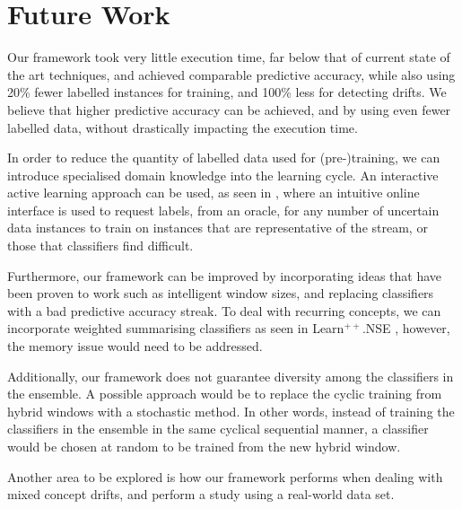 
\section{Future Work}
Our framework took very little execution time, far below that of current state of the art techniques, and achieved comparable predictive accuracy, while also using 20\% fewer labelled instances for training, and 100\% less for detecting drifts. We believe that higher predictive accuracy can be achieved, and by using even fewer labelled data, without drastically impacting the execution time.

In order to reduce the quantity of labelled data used for (pre-)training, we can introduce specialised domain knowledge into the learning cycle. An interactive active learning approach can be used, as seen in \cite{floyd2017activetext}, where an intuitive online interface is used to request labels, from an oracle, for any number of uncertain data instances to train on instances that are representative of the stream, or those that classifiers find difficult.

Furthermore, our framework can be improved by incorporating ideas that have been proven to work such as intelligent window sizes, and replacing classifiers with a bad predictive accuracy streak. To deal with recurring concepts, we can incorporate weighted summarising classifiers as seen in Learn$^{++}$.NSE \cite{elwell2011incremental}, however, the memory issue would need to be addressed.

Additionally, our framework does not guarantee diversity among the classifiers in the ensemble. A possible approach would be to replace the cyclic training from hybrid windows with a stochastic method. In other words, instead of training the classifiers in the ensemble in the same cyclical sequential manner, a classifier would be chosen at random to be trained from the new hybrid window.

Another area to be explored is how our framework performs when dealing with mixed concept drifts, and perform a study using a real-world data set.